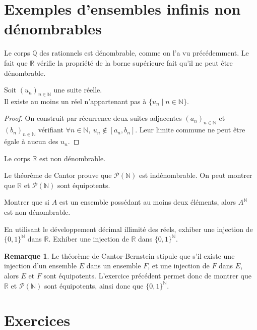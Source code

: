 \documentclass[french]{article}
\newcommand{\N}{\mathbb{N}}
\newcommand{\Q}{\mathbb{Q}}
\newcommand{\R}{\mathbb{R}}
\theoremstyle{plain}
\theoremstyle{definition}
\newtheorem*{rmq}{Remarque}
\theoremstyle{remark}
\begin{document}
\section{Exemples d'ensembles infinis non dénombrables}

Le corps $\Q$ des rationnels est dénombrable, comme on l'a vu précédemment. Le fait que $\R$ vérifie la propriété de la borne supérieure fait qu'il ne peut être dénombrable.

\begin{lem}%
	Soit $(u_n)_{n\in\N}$ une suite réelle.\\
	Il existe au moins un réel n'appartenant pas à $\{u_n \mid  n\in\N\}$.
\end{lem}
\begin{proof}
	On construit par récurrence deux suites adjacentes $(a_n)_{n\in\N}$ et $(b_n)_{n\in\N}$ vérifiant $\forall n\in\N,\  u_n\notin[a_n,b_n]$. Leur limite commune ne peut être égale à aucun des $u_n$.
\end{proof}

\begin{cor}%
	Le corps $\R$ est non dénombrable.
\end{cor}

Le théorème de Cantor prouve que $\mathcal{P}(\N)$ est indénombrable. On peut montrer que $\R$ et $\mathcal{P}(\N)$ sont équipotents.

\begin{exo}
	Montrer que si $A$ est un ensemble possédant au moins deux éléments, alors $A^\N$ est non dénombrable.
\end{exo}

\begin{exo}
	En utilisant le développement décimal illimité des réels, exhiber une injection de $\{0,1\}^\N$ dans $\R$. Exhiber une injection de $\R$ dans $\{0,1\}^\N$.
\end{exo}

\begin{rmq}
	Le théorème de Cantor-Bernstein stipule que s'il existe une injection d'un ensemble $E$ dans un ensemble $F$, et une injection de $F$ dans $E$, alors $E$ et $F$ sont équipotents. L'exercice précédent permet donc de montrer que $\R$ et $\mathcal{P}(\N)$ sont équipotents, ainsi donc que $\{0,1\}^\N$.
\end{rmq}

\section{Exercices}
\end{document}
